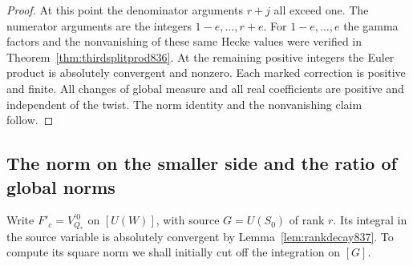 \documentclass[a4paper,11pt]{article}
\theoremstyle{definition}
\theoremstyle{remark}
\numberwithin{equation}{section}
\begin{document}
\begin{proof}
At this point the denominator arguments \(r+j\) all exceed
one. The numerator arguments are the integers \(1-e,\ldots,r+e\).
For \(1-e,\ldots,e\) the gamma factors and the nonvanishing
of these same Hecke values were verified in
Theorem~\ref{thm:thirdsplitprod836}. At the remaining positive
integers the Euler product is absolutely convergent and
nonzero. Each marked correction is positive and finite.
All changes of global measure and all real coefficients are
positive and independent of the twist. The norm identity
and the nonvanishing claim follow.
\end{proof}
\clearpage

\subsection{The norm on the smaller side and the ratio of global norms}
\label{sec:thirdsmallnorm840}
Write \(F'_c=V^{\prime0}_{Q_*}\) on \([U(W)]\), with source
\(G=U(S_0)\) of rank \(r\). Its integral in the source
variable is absolutely convergent by Lemma~\ref{lem:rankdecay837}.
To compute its square norm we shall initially cut off the
integration on \([G]\).
\end{document}
